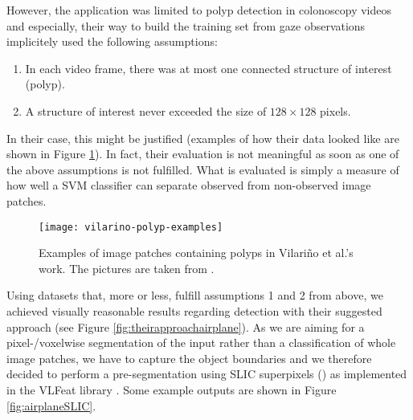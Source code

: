 However, the application was limited to polyp detection in colonoscopy videos and especially, their way to build the training set from gaze observations implicitely used the following assumptions:
\begin{enumerate}
 \item In each video frame, there was at most one connected structure of interest (polyp).
 \item A structure of interest never exceeded the size of $128 \times 128$ pixels.
\end{enumerate}
In their case, this might be justified (examples of how their data looked like are shown in Figure \ref{fig:vilarinoPolypExamples}). 
In fact, their evaluation is not meaningful as soon as one of the above assumptions is not fulfilled. What is evaluated is simply a measure of how well a SVM classifier can separate observed from non-observed image patches. 

\begin{figure}[ht]
	\centering
	\texttt{[image: vilarino-polyp-examples]}
	\caption{Examples of image patches containing polyps in Vilari\~no et al.'s work. The pictures are taken from \cite{vilarino2007automatic}.}
	\label{fig:vilarinoPolypExamples}
\end{figure}
Using datasets that, more or less, fulfill assumptions 1 and 2 from above, we achieved visually reasonable results regarding detection with their suggested approach (see Figure \ref{fig:theirapproachairplane}). 
As we are aiming for a pixel-/voxelwise segmentation of the input rather than a classification of whole image patches, we have to capture the object boundaries and we therefore decided to perform a pre-segmentation using SLIC superpixels (\cite{achanta2010slic}) as implemented in the VLFeat library \cite{vedaldi08vlfeat}. Some example outputs are shown in Figure \ref{fig:airplaneSLIC}. 

